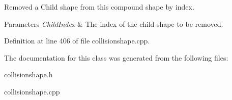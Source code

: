 Removed a Child shape from this compound shape by index. 


\begin{DoxyParams}{Parameters}
{\em ChildIndex} & The index of the child shape to be removed. \\
\hline
\end{DoxyParams}


Definition at line 406 of file collisionshape.cpp.



The documentation for this class was generated from the following files:\begin{DoxyCompactItemize}
\item 
collisionshape.h\item 
collisionshape.cpp\end{DoxyCompactItemize}
